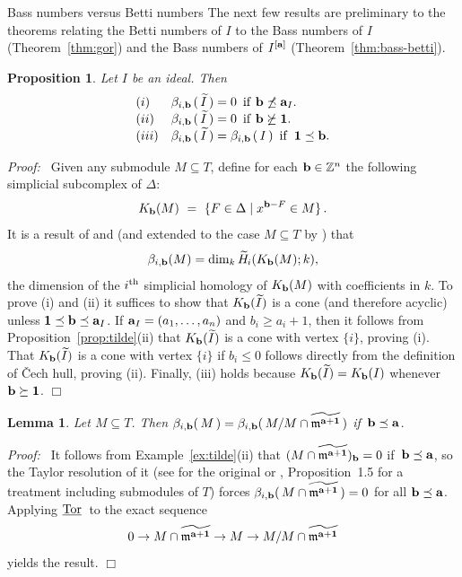 \documentclass[12pt,leqno]{article}
\newtheorem{lemma}[thm]{Lemma}
\newtheorem{prop}[thm]{Proposition}
\def\ttor{{{\underline{\rm Tor}}{\scriptstyle \;}}}
\def\aa{{{\rm \bf a}}}
\def\bb{{{\rm \bf b}}}
\def\mm{{\mathfrak m}}
\def\HH{{\widetilde H}{\scriptstyle \!}{}}
\def\ZZ{{\mathbb Z}}
\begin{document}
\begin{section}{Bass numbers versus Betti numbers}
The next few results are preliminary to the theorems relating the Betti
numbers of $I$ to the Bass numbers of $I$ (Theorem~\ref{thm:gor}) and the
Bass numbers of $I^{[\aa]}$ (Theorem~\ref{thm:bass-betti}).
\begin{prop} \label{prop:Ibetti}
Let $I$ be an ideal.  Then
$$
\begin{array}{ll}
(i)
&	\beta_{i,\bb\,}(\,\widetilde{I}\,) = 0\,
	{\rm \ if\ } \bb \not\preceq \aa_I. \cr
(ii)
&	\beta_{i,\bb\,}(\,\widetilde{I}\,) = 0\, 
	{\rm \ if\ } \bb \not\succeq {\bf 1}. \cr
(iii)
&	\beta_{i,\bb\,}(\,\widetilde{I}\,) = \beta_{i,\bb\,}(\,I\,)\, 
	{\rm \ if\ } \,{\bf 1} \preceq \bb. \cr
\end{array}
$$
\end{prop}
{\it Proof:\ } Given any submodule $M \subseteq T$, define for each $\bb
\in \ZZ^n$ the following simplicial subcomplex of $\Delta$:
$$
  K_\bb(M) \ = \ \{F \in \Delta \mid x^{\bb - F} \in M\}\,.
$$
It is a result of \cite{Hoc} and \cite{Ros} (and extended to the case $M
\subseteq T$ by \cite{BS}) that
$$
  \beta_{i,\bb}(M) = \dim_k\HH_i(K_\bb(M);k), 
$$
the dimension of the $i^{\rm th}$ simplicial homology of $K_\bb(M)$ with
coefficients in $k$.  To prove (i) and (ii) it suffices to show that
$K_\bb(\widetilde{I})$ is a cone (and therefore acyclic) unless ${\bf 1}
\preceq \bb \preceq \aa_I$.  If $\aa_I = (a_1,\ldots,a_n)$ and $b_i \geq
a_i + 1$, then it follows from Proposition~\ref{prop:tilde}(ii) that
$K_\bb(\widetilde{I})$ is a cone with vertex $\{i\}$, proving (i).  That
$K_\bb(\widetilde{I})$ is a cone with vertex $\{i\}$ if $b_i \leq 0$
follows directly from the definition of \v Cech hull, proving (ii).
Finally, (iii) holds because $K_\bb(\widetilde{I}) = K_\bb(I)$ whenever
$\bb \succeq {\bf 1}$.
%
\hfill
$\Box$
\begin{lemma} \label{lemma:cutoff}
Let $M \subseteq T$.  Then $\beta_{i,\bb}(\,M\,) = \beta_{i,\bb}(\,M / M
\cap \widetilde{\mm^{\aa + {\bf 1}}}\,)$ if \,$\bb \preceq \aa$.
\end{lemma}
{\it Proof:\ } It follows from Example~\ref{ex:tilde}(ii) that $(M \cap
\widetilde{\mm^{\aa + {\bf 1}}})_\bb = 0$ if \,$\bb \preceq \aa$, so the
Taylor resolution of it (see \cite{Tay} for the original or \cite{BS},
Proposition~1.5 for a treatment including submodules of $T$) forces
$\beta_{i,\bb}(\,M \cap \widetilde{\mm^{\aa + {\bf 1}}}\,) = 0$ for all
$\bb \preceq \aa$.  Applying $\ttor$ to the exact sequence
$$
  0 \to M \cap \widetilde{\mm^{\aa + {\bf 1}}} \to M \to M / M \cap
  \widetilde{\mm^{\aa + {\bf 1}}}
$$
yields the result.
%
\hfill
$\Box$


\end{section}
\end{document}
